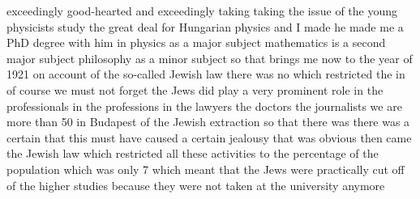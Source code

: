 \documentclass{article}
\begin{document}
exceedingly good-hearted and exceedingly taking taking the issue of the young physicists study the great deal for Hungarian physics and I made he made me a PhD degree with him in physics as a major subject mathematics is a second major subject philosophy as a minor subject so that brings me now to the year of 1921 on account of the so-called Jewish law there was no which restricted the in of course we must not forget the Jews did play a very prominent role in the professionals in the professions in the lawyers the doctors the journalists we are more than 50 in Budapest of the Jewish extraction so that there was there was a certain that this must have caused a certain jealousy that was obvious then came the Jewish law which restricted all these activities to the percentage of the population which was only 7 which meant that the Jews were practically cut off of the higher studies because they were not taken at the university anymore
\end{document}
